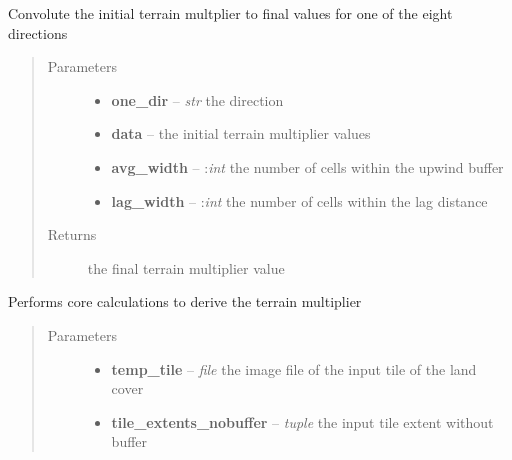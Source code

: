 \documentclass[letterpaper,10pt,english]{sphinxmanual}
\begin{document}
\begin{fulllineitems}
\label{docs/terrain:terrain_mult.convo}
Convolute the initial terrain multplier to final values for one of the
eight directions
\begin{quote}\begin{description}
\item[{Parameters}] \leavevmode\begin{itemize}
\item {} 
\textbf{one\_dir} -- \emph{str} the direction

\item {} 
\textbf{data} --  the initial terrain multiplier values

\item {} 
\textbf{avg\_width} -- :\emph{int} the number of cells within the upwind buffer

\item {} 
\textbf{lag\_width} -- :\emph{int} the number of cells within the lag distance

\end{itemize}

\item[{Returns}] \leavevmode
{} the final terrain multiplier value

\end{description}\end{quote}

\end{fulllineitems}



\begin{fulllineitems}
\label{docs/terrain:terrain_mult.terrain}
Performs core calculations to derive the terrain multiplier
\begin{quote}\begin{description}
\item[{Parameters}] \leavevmode\begin{itemize}
\item {} 
\textbf{temp\_tile} -- \emph{file} the image file of the input tile of the land cover

\item {} 
\textbf{tile\_extents\_nobuffer} -- \emph{tuple} the input tile extent without buffer

\end{itemize}

\end{description}\end{quote}

\end{fulllineitems}
\end{document}
